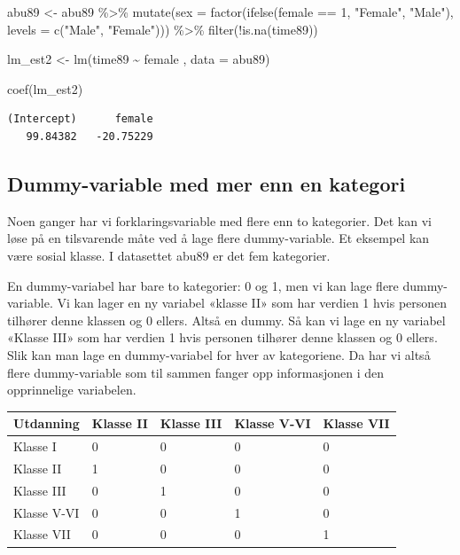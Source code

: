 \documentclass[
  letterpaper,
  DIV=11,
  numbers=noendperiod]{scrreprt}
\newenvironment{Shaded}{\begin{snugshade}}{\end{snugshade}}
\newcommand{\AttributeTok}[1]{\textcolor[rgb]{0.40,0.45,0.13}{#1}}
\newcommand{\DecValTok}[1]{\textcolor[rgb]{0.68,0.00,0.00}{#1}}
\newcommand{\FunctionTok}[1]{\textcolor[rgb]{0.28,0.35,0.67}{#1}}
\newcommand{\NormalTok}[1]{\textcolor[rgb]{0.00,0.23,0.31}{#1}}
\newcommand{\OtherTok}[1]{\textcolor[rgb]{0.00,0.23,0.31}{#1}}
\newcommand{\SpecialCharTok}[1]{\textcolor[rgb]{0.37,0.37,0.37}{#1}}
\newcommand{\StringTok}[1]{\textcolor[rgb]{0.13,0.47,0.30}{#1}}
\theoremstyle{definition}
\theoremstyle{remark}
\begin{document}
\begin{Shaded}
\begin{Highlighting}[]
\NormalTok{abu89 }\OtherTok{\textless{}{-}}\NormalTok{ abu89 }\SpecialCharTok{\%\textgreater{}\%}
  \FunctionTok{mutate}\NormalTok{(}\AttributeTok{sex =} \FunctionTok{factor}\NormalTok{(}\FunctionTok{ifelse}\NormalTok{(female }\SpecialCharTok{==} \DecValTok{1}\NormalTok{, }\StringTok{"Female"}\NormalTok{, }\StringTok{"Male"}\NormalTok{), }\AttributeTok{levels =} \FunctionTok{c}\NormalTok{(}\StringTok{"Male"}\NormalTok{, }\StringTok{"Female"}\NormalTok{))) }\SpecialCharTok{\%\textgreater{}\%} 
  \FunctionTok{filter}\NormalTok{(}\SpecialCharTok{!}\FunctionTok{is.na}\NormalTok{(time89))}

\NormalTok{lm\_est2 }\OtherTok{\textless{}{-}} \FunctionTok{lm}\NormalTok{(time89 }\SpecialCharTok{\textasciitilde{}}\NormalTok{ female , }\AttributeTok{data =}\NormalTok{ abu89)}

\FunctionTok{coef}\NormalTok{(lm\_est2)}
\end{Highlighting}
\end{Shaded}

\begin{verbatim}
(Intercept)      female 
   99.84382   -20.75229 
\end{verbatim}

\hypertarget{dummy-variable-med-mer-enn-en-kategori}{%
\subsection{Dummy-variable med mer enn en
kategori}\label{dummy-variable-med-mer-enn-en-kategori}}

Noen ganger har vi forklaringsvariable med flere enn to kategorier. Det
kan vi løse på en tilsvarende måte ved å lage flere dummy-variable. Et
eksempel kan være sosial klasse. I datasettet abu89 er det fem
kategorier.

En dummy-variabel har bare to kategorier: 0 og 1, men vi kan lage flere
dummy-variable. Vi kan lager en ny variabel «klasse II» som har verdien
1 hvis personen tilhører denne klassen og 0 ellers. Altså en dummy. Så
kan vi lage en ny variabel «Klasse III» som har verdien 1 hvis personen
tilhører denne klassen og 0 ellers. Slik kan man lage en dummy-variabel
for hver av kategoriene. Da har vi altså flere dummy-variable som til
sammen fanger opp informasjonen i den opprinnelige variabelen.

\begin{longtable}[]{@{}lllll@{}}
\toprule()
Utdanning & Klasse II & Klasse III & Klasse V-VI & Klasse VII \\
\midrule()
\endhead
Klasse I & 0 & 0 & 0 & 0 \\
Klasse II & 1 & 0 & 0 & 0 \\
Klasse III & 0 & 1 & 0 & 0 \\
Klasse V-VI & 0 & 0 & 1 & 0 \\
Klasse VII & 0 & 0 & 0 & 1 \\
\bottomrule()
\end{longtable}
\end{document}
